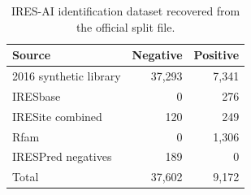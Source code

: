 \begin{table}[t]
\centering
\caption{IRES-AI identification dataset recovered from the official split file.}
\label{tab:data}
\begin{tabular}{lrr}
\toprule
Source & Negative & Positive \\
\midrule
2016 synthetic library & 37,293 & 7,341 \\
IRESbase & 0 & 276 \\
IRESite combined & 120 & 249 \\
Rfam & 0 & 1,306 \\
IRESPred negatives & 189 & 0 \\
\midrule
Total & 37,602 & 9,172 \\
\bottomrule
\end{tabular}
\end{table}
